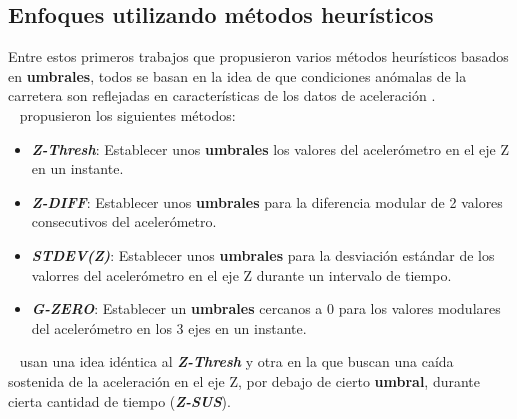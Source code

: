 	\subsection{Enfoques utilizando métodos heurísticos}
		Entre estos primeros trabajos que propusieron varios métodos heurísticos basados en \textbf{umbrales}, todos se basan en la idea
		de que condiciones anómalas de la carretera son reflejadas en características de los datos de aceleración .\\
		~\textcite{mednis2011real} propusieron los siguientes métodos:\\

		\begin{itemize}
			\item  \emph{\textbf {Z-Thresh}}: Establecer unos \textbf{umbrales} los valores del acelerómetro en el eje Z en un instante.\\
			\item \emph{\textbf {Z-DIFF}}: Establecer unos \textbf{umbrales} para la diferencia modular de 2 valores consecutivos del
				acelerómetro.\\
			\item \emph{\textbf {STDEV(Z)}}: Establecer unos \textbf{umbrales} para la desviación estándar de los valorres del acelerómetro en
				el eje Z durante un intervalo de tiempo.\\ 
			\item \emph{\textbf {G-ZERO}}: Establecer un \textbf{umbrales} cercanos a 0 para los valores modulares del acelerómetro
				en los 3 ejes en un instante.\\
		\end{itemize}

		~\textcite{mohan2008nericell} usan una idea idéntica al \emph{\textbf{Z-Thresh}} y otra en la que buscan una caída sostenida de la 
		aceleración en el eje Z, por debajo de cierto \textbf{umbral}, durante cierta cantidad de tiempo (\emph{\textbf{Z-SUS}}).\\



